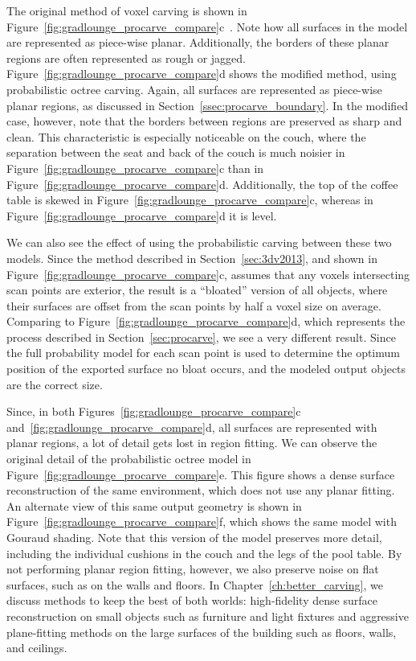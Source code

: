 \documentclass[12pt,onecolumn,oneside]{book}
\begin{document}
The original method of voxel carving is shown in Figure~\ref{fig:gradlounge_procarve_compare}c~\cite{Turner13}.  Note how all surfaces in the model are represented as piece-wise planar.  Additionally, the borders of these planar regions are often represented as rough or jagged.  Figure~\ref{fig:gradlounge_procarve_compare}d shows the modified method, using probabilistic octree carving.  Again, all surfaces are represented as piece-wise planar regions, as discussed in Section~\ref{ssec:procarve_boundary}.  In the modified case, however, note that the borders between regions are preserved as sharp and clean.  This characteristic is especially noticeable on the couch, where the separation between the seat and back of the couch is much noisier in Figure~\ref{fig:gradlounge_procarve_compare}c than in Figure~\ref{fig:gradlounge_procarve_compare}d.  Additionally, the top of the coffee table is skewed in Figure~\ref{fig:gradlounge_procarve_compare}c, whereas in Figure~\ref{fig:gradlounge_procarve_compare}d it is level.

We can also see the effect of using the probabilistic carving between these two models.  Since the method described in Section~\ref{sec:3dv2013}, and shown in Figure~\ref{fig:gradlounge_procarve_compare}c, assumes that any voxels intersecting scan points are exterior, the result is a ``bloated'' version of all objects, where their surfaces are offset from the scan points by half a voxel size on average.  Comparing to Figure~\ref{fig:gradlounge_procarve_compare}d, which represents the process described in Section~\ref{sec:procarve}, we see a very different result.  Since the full probability model for each scan point is used to determine the optimum position of the exported surface no bloat occurs, and the modeled output objects are the correct size.

Since, in both Figures~\ref{fig:gradlounge_procarve_compare}c and~\ref{fig:gradlounge_procarve_compare}d, all surfaces are represented with planar regions, a lot of detail gets lost in region fitting.  We can observe the original detail of the probabilistic octree model in Figure~\ref{fig:gradlounge_procarve_compare}e.  This figure shows a dense surface reconstruction of the same environment, which does not use any planar fitting.  An alternate view of this same output geometry is shown in Figure~\ref{fig:gradlounge_procarve_compare}f, which shows the same model with Gouraud shading.  Note that this version of the model preserves more detail, including the individual cushions in the couch and the legs of the pool table.  By not performing planar region fitting, however, we also preserve noise on flat surfaces, such as on the walls and floors.  In Chapter~\ref{ch:better_carving}, we discuss methods to keep the best of both worlds:  high-fidelity dense surface reconstruction on small objects such as furniture and light fixtures and aggressive plane-fitting methods on the large surfaces of the building such as floors, walls, and ceilings.
\end{document}
